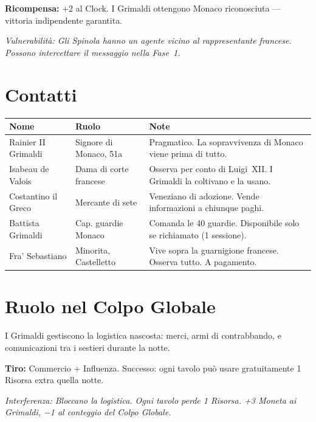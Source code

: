 \textbf{Ricompensa:} +2 al Clock. I Grimaldi ottengono Monaco riconosciuta —
vittoria indipendente garantita.

\textit{Vulnerabilità: Gli Spinola hanno un agente vicino al rappresentante francese.
Possono intercettare il messaggio nella Fase~1.}

\section{Contatti}


\begin{center}
\begin{tabularx}{\textwidth}{L{2.8cm} L{2.8cm} X}
  \toprule
  \textbf{Nome} & \textbf{Ruolo} & \textbf{Note} \\
  \midrule
  Rainier II Grimaldi& Signore di Monaco, 51a & Pragmatico. La sopravvivenza di Monaco viene prima di tutto. \\
  Isabeau de Valois  & Dama di corte francese & Osserva per conto di Luigi~XII. I Grimaldi la coltivano e la usano. \\
  Costantino il Greco& Mercante di sete       & Veneziano di adozione. Vende informazioni a chiunque paghi. \\
  Battista Grimaldi  & Cap. guardie Monaco    & Comanda le 40 guardie. Disponibile solo se richiamato (1 sessione). \\
  Fra' Sebastiano    & Minorita, Castelletto  & Vive sopra la guarnigione francese. Osserva tutto. A pagamento. \\
  \bottomrule
\end{tabularx}
\end{center}

\section{Ruolo nel Colpo Globale}

I Grimaldi gestiscono la logistica nascosta: merci, armi di contrabbando,
e comunicazioni tra i sestieri durante la notte.

\textbf{Tiro:} Commercio + Influenza. Successo: ogni tavolo può usare
gratuitamente 1 Risorsa extra quella notte.

\textit{Interferenza: Bloccano la logistica. Ogni tavolo perde 1 Risorsa.
+3 Moneta ai Grimaldi, −1 al conteggio del Colpo Globale.}
